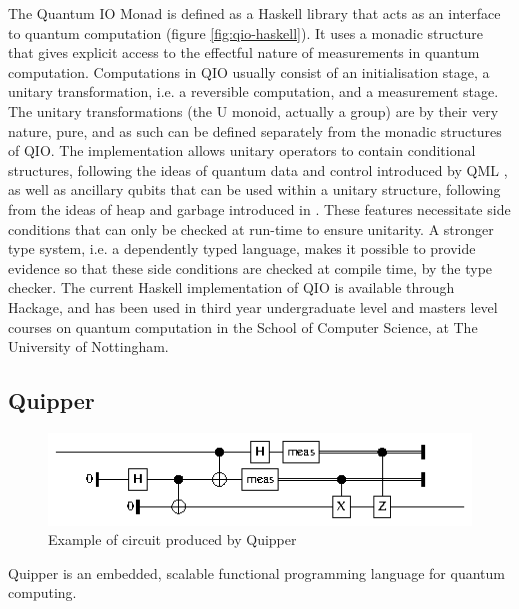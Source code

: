 \documentclass[a4paper]{article}
\begin{document}
The Quantum IO Monad  is defined as a
Haskell library that acts as an interface to quantum computation
(figure \ref{fig:qio-haskell}). It uses a monadic structure that gives
explicit access to the effectful nature of measurements in quantum
computation.  Computations in QIO usually consist of an initialisation
stage, a unitary transformation, i.e. a reversible computation, and a
measurement stage. The unitary transformations (the U monoid, actually
a group) are by their very nature, pure, and as such can be defined
separately from the monadic structures of QIO. The implementation
allows unitary operators to contain conditional structures, following
the ideas of quantum data and control introduced by QML
, as well as ancillary qubits that can be used
within a unitary structure, following from the ideas of heap and
garbage introduced in . These features
necessitate side conditions that can only be checked at run-time to
ensure unitarity.
A stronger type system, i.e. a dependently typed language, makes it
possible to provide evidence so that these side conditions are
checked at compile time, by the type checker. The current Haskell
implementation of QIO is available through Hackage,
and has been used in third year undergraduate level and masters level
courses on quantum computation in the School of Computer Science, at
The University of Nottingham.

\subsection*{Quipper}

\begin{figure}
\includegraphics[width=\columnwidth]{teleport.eps}
\caption{Example of circuit produced by Quipper}\label{fig:quipper-circ}
\end{figure}

Quipper  is an embedded, scalable
functional programming language for quantum computing.
\end{document}
